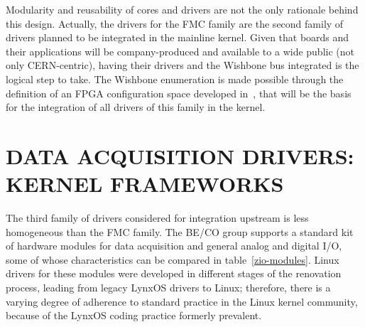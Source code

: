 \documentclass{JAC2003}
\begin{document}
Modularity and reusability of cores and drivers are not the only
rationale behind this design. Actually, the drivers for the FMC family
are the second family of drivers planned to be integrated in the
mainline kernel. Given that boards and their applications will be
company-produced and available to a wide public (not only CERN-centric),
having their drivers and the Wishbone bus integrated is the logical step
to take. The Wishbone enumeration is made possible through the
definition of an FPGA configuration space developed
in~\cite{fpga-config-space}, that will be the basis for the integration of
all drivers of this family in the kernel.

\section{DATA ACQUISITION DRIVERS: KERNEL FRAMEWORKS}

The third family of drivers considered for integration upstream is less
homogeneous than the FMC family. The BE/CO group supports a standard kit
of hardware modules for data acquisition and general analog and digital
I/O, some of whose characteristics can be compared in
table~\ref{zio-modules}. Linux drivers for these modules were developed in
different stages of the renovation process, leading from legacy
LynxOS drivers to Linux; therefore, there is a varying degree of adherence to
standard practice in the Linux kernel community, because of the
LynxOS coding practice formerly prevalent.
\end{document}
